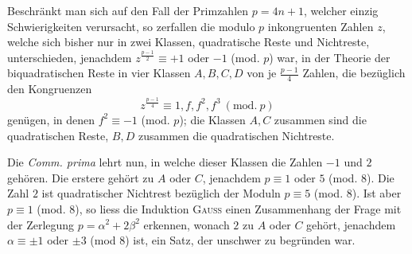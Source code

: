Beschränkt man sich auf den Fall der Primzahlen \(p=4n+1\), welcher einzig Schwierigkeiten verursacht, so zerfallen die modulo \(p\) inkongruenten Zahlen \(z\), welche sich bisher nur in zwei Klassen, quadratische Reste und Nichtreste, unterschieden, jenachdem \(z^{\frac{p-1}{2}}\equiv+1\) oder \(-1\) (mod. \(p\)) war, in der Theorie der biquadratischen Reste in vier Klassen \(A,B,C,D\) von je \(\frac{p-1}{4}\) Zahlen, die bezüglich den Kongruenzen
\[
z^{\frac{p-1}{4}}\equiv1,f,f^2,f^3\ (\mathrm{mod.}\ p)
\]
genügen, in denen \(f^2\equiv-1\) (mod. \(p\)); die Klassen \(A,C\) zusammen sind die quadratischen Reste, \(B,D\) zusammen die quadratischen Nichtreste.

Die \textit{Comm. prima} lehrt nun, in welche dieser Klassen die Zahlen \(-1\) und \(2\) gehören. Die erstere gehört zu \(A\) oder \(C\), jenachdem \(p\equiv1\) oder \(5\) (mod. 8). Die Zahl \(2\) ist quadratischer Nichtrest bezüglich der Moduln \(p\equiv5\) (mod. 8). Ist aber \(p\equiv1\) (mod. 8), so liess die Induktion \textsc{Gauss} einen Zusammenhang der Frage mit der Zerlegung \(p=\alpha^2+2\beta^2\) erkennen, wonach \(2\) zu \(A\) oder \(C\) gehört, jenachdem \(\alpha\equiv\pm1\) oder \(\pm3\) (mod 8) ist, ein Satz, der unschwer zu begründen war.

